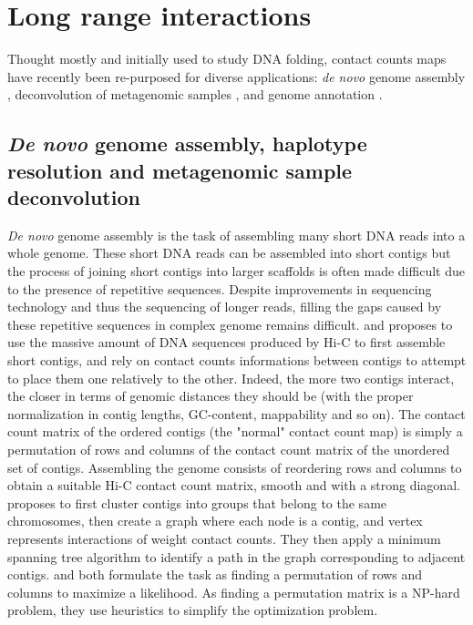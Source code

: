 \section{Long range interactions}


Thought mostly and initially used to study DNA folding, contact counts maps
have recently been re-purposed for diverse applications: \textit{de novo}
genome assembly \citep{burton:chromosome, kaplan:high-throughput},
deconvolution of metagenomic samples \citep{burton:species-level,
beitel:strain}, and genome annotation \citep{marie-nelly:filling,
varoquaux:accurate}.

\subsection{\textit{De novo} genome assembly, haplotype resolution and
metagenomic sample deconvolution}

\textit{De novo} genome assembly is the task of assembling many short DNA
reads into a whole genome. These short DNA reads can be assembled into short
contigs but the process of joining short contigs into larger scaffolds is
often made difficult due to the presence of repetitive sequences. Despite
improvements in sequencing technology and thus the sequencing of longer reads,
filling the gaps caused by these repetitive sequences in complex genome
remains difficult. \citet{burton:chromosome} and
\citet{kaplan:high-throughput} proposes to use the massive amount of DNA
sequences produced by Hi-C to first assemble short contigs, and rely on
contact counts informations between contigs to attempt to place them one
relatively to the other. Indeed, the more two contigs interact, the closer in
terms of genomic distances they should be (with the proper normalization in
contig lengths, GC-content, mappability and so on). The contact count matrix
of the ordered contigs (the "normal" contact count map) is simply a
permutation of rows and columns of the contact count matrix of the unordered
set of contigs. Assembling the genome consists of reordering rows and
columns to obtain a suitable Hi-C contact count matrix, smooth and with a
strong diagonal. \citet{burton:chromosome} proposes to first cluster contigs
into groups that belong to the same chromosomes, then create a graph where
each node is a contig, and vertex represents interactions of weight contact
counts. They then apply a minimum spanning tree algorithm to identify a path
in the graph corresponding to adjacent contigs. \citet{kaplan:high-throughput}
and \citet{marie-nelly:high-quality} both formulate the task as finding a
permutation of rows and columns to maximize a likelihood. As finding a
permutation matrix is a NP-hard problem, they use heuristics to simplify the
optimization problem.

